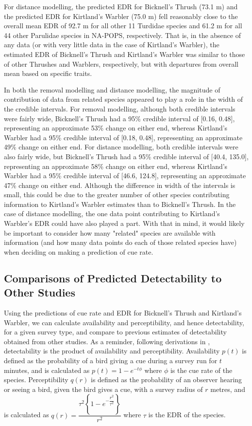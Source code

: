 \documentclass[12pt]{article}
\begin{document}
\par For distance modelling, the predicted EDR for Bicknell's Thrush (73.1 m) and the predicted EDR for Kirtland's Warbler (75.0 m) fell reasonably close to the overall mean EDR of 92.7 m for all other 11 Turdidae species and 61.2 m for all 44 other Parulidae species in NA-POPS, respectively.
That is, in the absence of any data (or with very little data in the case of Kirtland's Warbler), the estimated EDR of Bicknell's Thrush and Kirtland's Warbler was similar to those of other Thrushes and Warblers, respectively, but with departures from overall mean based on specific traits.

\par In both the removal modelling and distance modelling, the magnitude of contribution of data from related species appeared to play a role in the width of the credible intervals.
For removal modelling, although both credible intervals were fairly wide, Bicknell's Thrush had a 95\% credible interval of [0.16, 0.48], representing an approximate 53\% change on either end, whereas Kirtland's Warbler had a 95\% credible interval of [0.18, 0.48], representing an approximate 49\% change on either end.
For distance modelling, both credible intervals were also fairly wide, but Bicknell's Thrush had a 95\% credible interval of [40.4, 135.0], representing an approximate 58\% change on either end, whereas Kirtland's Warbler had a 95\% credible interval of [46.6, 124.8], representing an approximate 47\% change on either end.
Although the difference in width of the intervals is small, this could be due to the greater number of other species contributing information to Kirtland's Warbler estimates than to Bicknell's Thrush.
In the case of distance modelling, the one data point contributing to Kirtland's Warbler's EDR could have also played a part.
With that in mind, it would likely be important to consider how many "related" species are available with information (and how many data points do each of those related species have) when deciding on making a prediction of cue rate.

\subsection{Comparisons of Predicted Detectability to Other Studies}

\par Using the predictions of cue rate and EDR for Bicknell's Thrush and Kirtland's Warbler, we can calculate availability and perceptibility, and hence detectability, for a given survey type, and compare to previous estimates of detectability obtained from other studies.
As a reminder, following derivations in \citet{solymos_calibrating_2013}, detectability is the product of availability and perceptibility.
Availability $p(t)$ is defined as the probability of a bird giving a cue during a survey run for $t$ minutes, and is calculated as
$p(t) = 1 - e^{-t\phi}$
where $\phi$ is the cue rate of the species.
Perceptibility $q(r)$ is defined as the probability of an observer hearing or seeing a bird, given the bird gives a cue, with a survey radius of $r$ metres, and is calculated as
$q(r) = \dfrac{\tau^2 \left\{1 - e^{-\dfrac{r^2}{\tau^2}}\right\}}{r^2}$
where $\tau$ is the EDR of the species.
\end{document}
